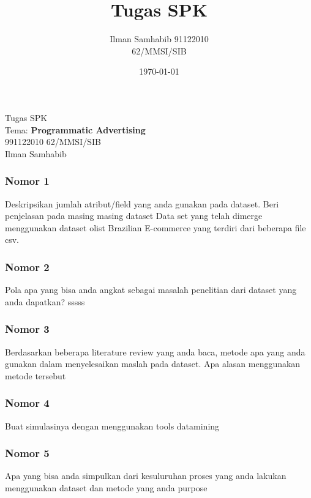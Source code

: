 \documentclass{article}
\title{Tugas SPK}
\author{Ilman Samhabib 91122010\\62/MMSI/SIB}
\date{\today}
\begin{document}
\begin{center}
    Tugas SPK
    \\ Tema: \textbf{Programmatic Advertising} 
    \\ 991122010 62/MMSI/SIB
    \\ Ilman Samhabib
\end{center}

\subsubsection*{Nomor 1}
Deskripsikan jumlah atribut/field yang anda gunakan pada dataset. Beri penjelasan pada masing masing dataset
\bigbreak
Data set yang telah dimerge menggunakan dataset olist Brazilian E-commerce \cite{olist_2018}  yang terdiri dari beberapa file csv.
\subsubsection*{Nomor 2}
Pola apa yang bisa anda angkat sebagai masalah penelitian dari dataset yang anda dapatkan?
\bigbreak
sssss
\subsubsection*{Nomor 3}
Berdasarkan beberapa literature review yang anda baca, 
metode apa yang anda gunakan dalam menyelesaikan maslah pada dataset. 
Apa alasan menggunakan metode tersebut
\subsubsection*{Nomor 4}
Buat simulasinya dengan menggunakan tools datamining 
\subsubsection*{Nomor 5}
Apa yang bisa anda simpulkan dari kesuluruhan proses yang anda lakukan menggunakan dataset dan metode yang anda purpose






\end{document}
